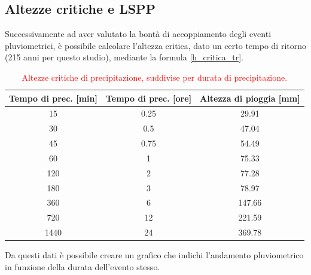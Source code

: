 \subsection{Altezze critiche e LSPP}

Successivamente ad aver valutato la bontà di accoppiamento degli eventi pluviometrici, è possibile calcolare l'altezza critica, dato un certo tempo di ritorno (215 anni per questo studio), mediante la formula \ref{h_critica_tr}.

\begin{table}[H] \centering
    \caption{\textcolor{red}{Altezze critiche di precipitazione, suddivise per durata di precipitazione.}}
            \begin{tabular}{ccc}
            \toprule
            Tempo di prec. [min] & Tempo di prec. [ore] & Altezza di pioggia [mm] \\
            \midrule
            15                       & 0.25                     & 29.91                       \\
            30                       & 0.5                      & 47.04                       \\
            45                       & 0.75                     & 54.49                       \\
            60                       & 1                        & 75.33                       \\
            120                      & 2                        & 77.28                       \\
            180                      & 3                        & 78.97                       \\
            360                      & 6                        & 147.66                      \\
            720                      & 12                       & 221.59                      \\
            1440                     & 24                       & 369.78                     \\
            \bottomrule
            \end{tabular}
\end{table}

\noindent Da questi dati è possibile creare un grafico che indichi l'andamento pluviometrico in funzione della durata dell'evento stesso.

